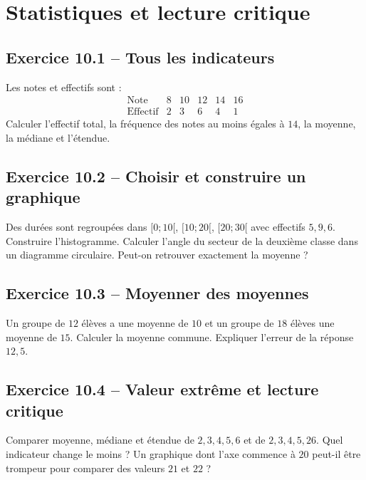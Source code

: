 \chapter{Statistiques et lecture critique}
\label{exercices:10}
\section*{Exercice 10.1 -- Tous les indicateurs}
Les notes et effectifs sont :
\[
\begin{array}{c|rrrrr}\text{Note}&8&10&12&14&16\\\hline\text{Effectif}&2&3&6&4&1\end{array}
\]
Calculer l'effectif total, la fréquence des notes au moins égales à $14$, la moyenne, la médiane et l'étendue.

\section*{Exercice 10.2 -- Choisir et construire un graphique}
Des durées sont regroupées dans $[0;10[$, $[10;20[$, $[20;30[$ avec effectifs $5,9,6$. Construire l'histogramme. Calculer l'angle du secteur de la deuxième classe dans un diagramme circulaire. Peut-on retrouver exactement la moyenne ?

\section*{Exercice 10.3 -- Moyenner des moyennes}
Un groupe de $12$ élèves a une moyenne de $10$ et un groupe de $18$ élèves une moyenne de $15$. Calculer la moyenne commune. Expliquer l'erreur de la réponse $12{,}5$.

\section*{Exercice 10.4 -- Valeur extrême et lecture critique}
Comparer moyenne, médiane et étendue de $2,3,4,5,6$ et de $2,3,4,5,26$. Quel indicateur change le moins ? Un graphique dont l'axe commence à $20$ peut-il être trompeur pour comparer des valeurs $21$ et $22$ ?
